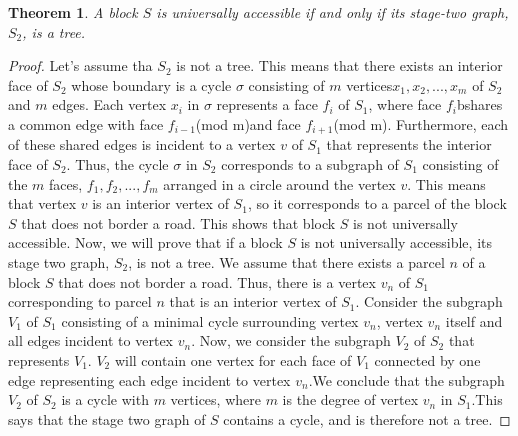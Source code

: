 \documentclass[10pt]{article}
\newtheorem{theorem}{Theorem}
\begin{document}
\begin{theorem}
    A block $S$ is universally accessible if and only if its stage-two graph, $S_2$, is a tree.
\end{theorem}
\begin{proof}
Let's assume tha $S_2$ is not a tree.  This means that there exists an interior face of $S_2$ whose boundary is a cycle $\sigma$ consisting of $m$ vertices${x_1, x_2, ...,x_m}$ of $S_2$ and $m$ edges. Each vertex $x_i$ in $\sigma$ represents a face $f_i$ of $S_1$, where face $f_i$bshares a common edge with face $f_{i-1}$(mod m)and face $f_{i+1}$(mod m). Furthermore, each of these shared edges is incident to a vertex $v$ of $S_1$ that represents the interior face of $S_2$. Thus, the cycle $\sigma$ in $S_2$ corresponds to a subgraph of $S_1$ consisting of the $m$ faces, ${f_1, f_2, ..., f_m}$ arranged in a circle around the vertex $v$. This means that vertex $v$ is an interior vertex of $S_1$, so it corresponds to a parcel of the block $S$ that does not border a road. This shows that block $S$ is not universally accessible. Now, we will prove that if a block $S$ is not universally accessible, its stage two graph, $S_2$, is not a tree. We assume that there exists a parcel $n$ of a block $S$ that does not border a road.  Thus, there is a vertex $v_n$ of $S_1$ corresponding to parcel $n$ that is an interior vertex of $S_1$. Consider the subgraph $V_1$ of $S_1$ consisting of a minimal cycle surrounding vertex $v_n$, vertex $v_n$ itself and all edges incident to vertex $v_n$. Now, we consider the subgraph $V_2$ of $S_2$ that represents $V_1$. $V_2$ will contain one vertex for each face of $V_1$ connected by one edge representing each edge incident to vertex $v_n$.We conclude that the subgraph $V_2$ of $S_2$ is a cycle with $m$ vertices, where $m$ is the degree of vertex $v_n$ in $S_1$.This says that the stage two graph of $S$ contains a cycle, and is therefore not a tree.
\end{proof}
\end{document}
